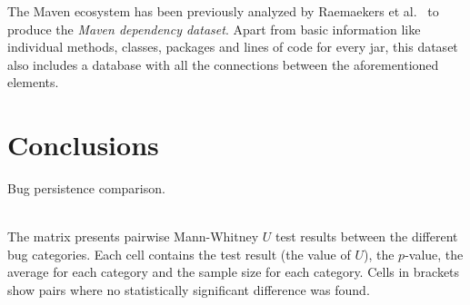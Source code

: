 \documentclass{sig-alternate}
\begin{document}
The Maven ecosystem has been previously analyzed by
Raemaekers et al.~\cite{RDV13}
to produce the {\it Maven dependency dataset}.
Apart from basic information like individual methods, classes,
packages and lines of code for every {\sc jar}, this dataset
also includes a database with all the
connections between the aforementioned elements.

\section{Conclusions}
\label{sec:conc}


  

\begin{landscape}
  \begin{table}
    \setlength{\extrarowheight}{0.10cm}
    \caption{Bug persistence comparison.}
    \label{tbl:bug_persistence}
    \resizebox{0.95\columnwidth}{!}{
    }\\
    The matrix presents pairwise Mann-Whitney $U$ test results
    between the different bug categories. Each cell contains the test
    result (the value of $U$), the $p$-value, the average for each
    category and the sample size for each category. Cells in brackets show
    pairs where no statistically significant difference was found.
  \end{table}
\end{landscape}
\end{document}
